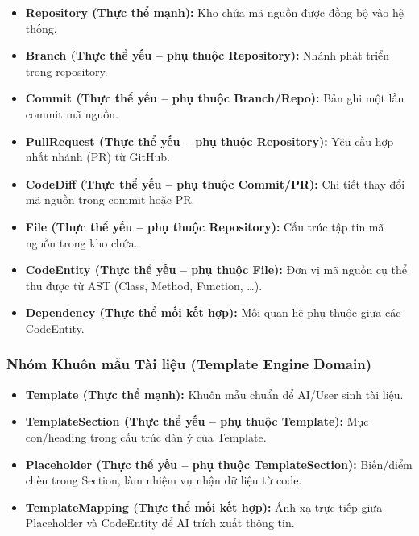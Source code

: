 \begin{itemize}

    \item \textbf{Repository (Thực thể mạnh):}
    Kho chứa mã nguồn được đồng bộ vào hệ thống.

    \item \textbf{Branch (Thực thể yếu -- phụ thuộc Repository):}
    Nhánh phát triển trong repository.

    \item \textbf{Commit (Thực thể yếu -- phụ thuộc Branch/Repo):}
    Bản ghi một lần commit mã nguồn.

    \item \textbf{PullRequest (Thực thể yếu -- phụ thuộc Repository):}
    Yêu cầu hợp nhất nhánh (PR) từ GitHub.

    \item \textbf{CodeDiff (Thực thể yếu -- phụ thuộc Commit/PR):}
    Chi tiết thay đổi mã nguồn trong commit hoặc PR.

    \item \textbf{File (Thực thể yếu -- phụ thuộc Repository):}
    Cấu trúc tập tin mã nguồn trong kho chứa.

    \item \textbf{CodeEntity (Thực thể yếu -- phụ thuộc File):}
    Đơn vị mã nguồn cụ thể thu được từ AST
    (Class, Method, Function, \ldots).

    \item \textbf{Dependency (Thực thể mối kết hợp):}
    Mối quan hệ phụ thuộc giữa các CodeEntity.

\end{itemize}


\subsubsection{Nhóm Khuôn mẫu Tài liệu (Template Engine Domain)}

\begin{itemize}

    \item \textbf{Template (Thực thể mạnh):}
    Khuôn mẫu chuẩn để AI/User sinh tài liệu.

    \item \textbf{TemplateSection (Thực thể yếu -- phụ thuộc Template):}
    Mục con/heading trong cấu trúc dàn ý của Template.

    \item \textbf{Placeholder (Thực thể yếu -- phụ thuộc TemplateSection):}
    Biến/điểm chèn trong Section, làm nhiệm vụ nhận dữ liệu từ code.

    \item \textbf{TemplateMapping (Thực thể mối kết hợp):}
    Ánh xạ trực tiếp giữa Placeholder và CodeEntity để AI trích xuất thông tin.

\end{itemize}


